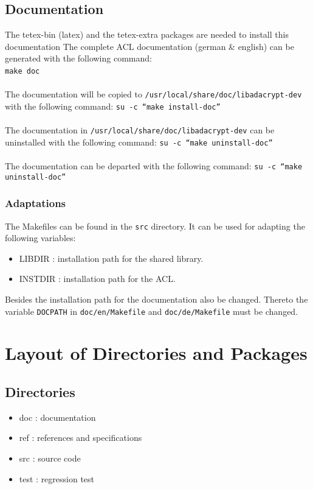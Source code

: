 \subsection{Documentation}
The tetex-bin (latex) and the tetex-extra packages are needed to install this 
documentation The complete ACL documentation (german \& english) can be 
generated with  the following command:\\
\hspace*{1cm} \texttt{make doc}\ \\ 
\ \\
The documentation will be copied to  
\texttt{/usr/local/share/doc/libadacrypt-dev} with the following command:
\hspace*{1cm} \texttt{su -c ``make install-doc''}\\ 
\ \\
The documentation in \texttt{/usr/local/share/doc/libadacrypt-dev} can be
uninstalled with the following command:
\hspace*{1cm} \texttt{su -c ``make uninstall-doc''}\\ 
\ \\
The documentation can be departed with the following command:
\hspace*{1cm} \texttt{su -c ``make uninstall-doc''}\\



\subsubsection{Adaptations}
The Makefiles can be found in the \texttt{src} directory. It can be used for
adapting the following variables:
\begin{itemize}
\item LIBDIR : installation path for the shared library.
\item INSTDIR : installation path for the ACL.
\end{itemize}
Besides the installation path for the documentation also be changed. Thereto
the variable \texttt{DOCPATH} in \texttt{doc/en/Makefile} and
\texttt{doc/de/Makefile} must be changed.



\section{Layout of Directories and Packages}
\subsection{Directories}
\begin{itemize}
\item doc : documentation
\item ref : references and specifications
\item src : source code
\item test : regression test
\end{itemize}

